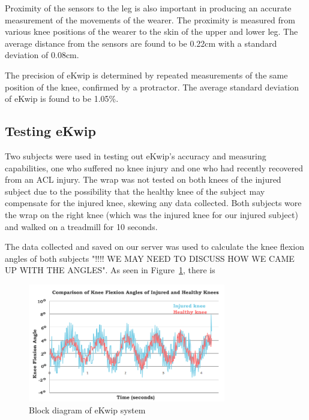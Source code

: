 Proximity of the sensors to the leg is also important in producing an accurate measurement of the movements of the wearer. The proximity is measured from various knee positions of the wearer to the skin of the upper and lower leg. The average distance from the sensors are found to be 0.22cm with a standard deviation of 0.08cm. 

The precision of eKwip is determined by repeated measurements of the same position of the knee, confirmed by a protractor. The average standard deviation of eKwip is found to be 1.05\%.

\subsection {Testing eKwip}
Two subjects were used in testing out eKwip's accuracy and measuring capabilities, one who suffered no knee injury and one who had recently recovered from an ACL injury. The wrap was not tested on both knees of the injured subject due to the possibility that the healthy knee of the subject may compensate for the injured knee, skewing any data collected. Both subjects wore the wrap on the right knee (which was the injured knee for our injured subject) and walked on a treadmill for 10 seconds.

The data collected and saved on our server was used to calculate the knee flexion angles of both subjects "!!!! WE MAY NEED TO DISCUSS HOW WE CAME UP WITH THE ANGLES". As seen in Figure~\ref{fig:results_graph}, there is 


\begin{figure}[h]
  \begin{center}
    \includegraphics[width=3.4in]{images/results_graph.PNG}
  \end{center}
  \caption{Block diagram of eKwip system}
  \label{fig:results_graph}
\end{figure}